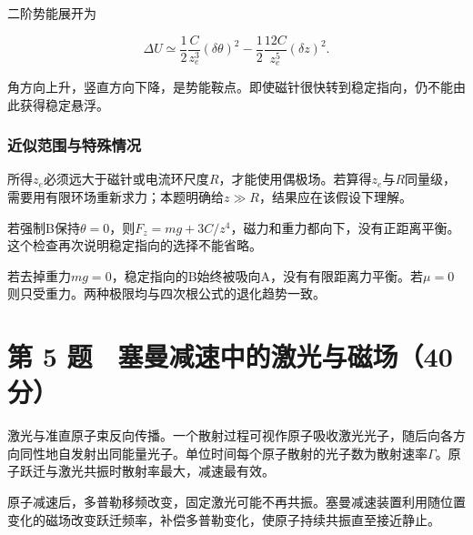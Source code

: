 \documentclass[12pt,a4paper,fontset=fandol]{ctexart}
\begin{document}
二阶势能展开为

\[
\Delta U\simeq
\frac12\frac C{z_e^3}(\delta\theta)^2
-\frac12\frac{12C}{z_e^5}(\delta z)^2.
\]

角方向上升，竖直方向下降，是势能鞍点。即使磁针很快转到稳定指向，仍不能由此获得稳定悬浮。

\subsubsection{近似范围与特殊情况}\label{ux8fd1ux4f3cux8303ux56f4ux4e0eux7279ux6b8aux60c5ux51b5}

所得\(z_e\)必须远大于磁针或电流环尺度\(R\)，才能使用偶极场。若算得\(z_e\)与\(R\)同量级，需要用有限环场重新求力；本题明确给\(z\gg R\)，结果应在该假设下理解。

若强制B保持\(\theta=0\)，则\(F_z=mg+3C/z^4\)，磁力和重力都向下，没有正距离平衡。这个检查再次说明稳定指向的选择不能省略。

若去掉重力\(m g=0\)，稳定指向的B始终被吸向A，没有有限距离力平衡。若\(\mu=0\)则只受重力。两种极限均与四次根公式的退化趋势一致。

\clearpage

\section{第 5
题　塞曼减速中的激光与磁场（40分）}\label{ux7b2c-5-ux9898-ux585eux66fcux51cfux901fux4e2dux7684ux6fc0ux5149ux4e0eux78c1ux573a40ux5206}

激光与准直原子束反向传播。一个散射过程可视作原子吸收激光光子，随后向各方向同性地自发射出同能量光子。单位时间每个原子散射的光子数为散射速率\(\Gamma\)。原子跃迁与激光共振时散射率最大，减速最有效。

原子减速后，多普勒移频改变，固定激光可能不再共振。塞曼减速装置利用随位置变化的磁场改变跃迁频率，补偿多普勒变化，使原子持续共振直至接近静止。

\begin{center}
\begin{minipage}{\linewidth}
\centering\begingroup{}
\ifdim\wd\diagrambox>.88\linewidth
\sbox{\diagrambox}{\resizebox{.88\linewidth}{!}{\usebox{\diagrambox}}}\fi
\ifdim\ht\diagrambox>.38\textheight
\resizebox{!}{.38\textheight}{\usebox{\diagrambox}}
\else\usebox{\diagrambox}\fi
\par{}\endgroup\end{minipage}\end{center}
\end{document}
